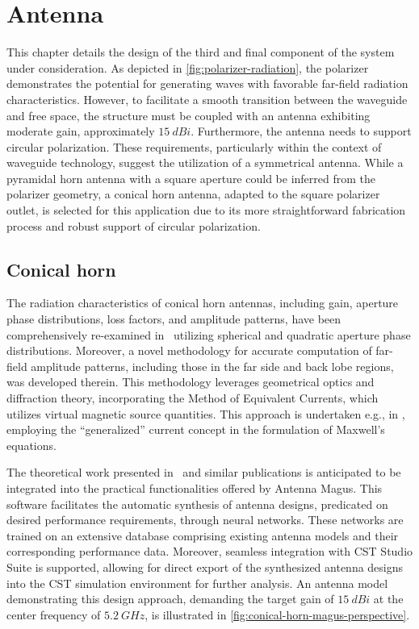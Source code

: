 \documentclass[14pt,a4paper]{ntust_report}
\begin{document}
\chapter{Antenna}
\label{chapter:antenna}
This chapter details the design of the third and final component of the system under consideration. As depicted in \cref{fig:polarizer-radiation}, the polarizer demonstrates the potential for generating waves with favorable far-field radiation characteristics. However, to facilitate a smooth transition between the waveguide and free space, the structure must be coupled with an antenna exhibiting moderate gain, approximately $\qty{15}{dBi}$. Furthermore, the antenna needs to support circular polarization. These requirements, particularly within the context of waveguide technology, suggest the utilization of a symmetrical antenna. While a pyramidal horn antenna with a square aperture could be inferred from the polarizer geometry, a conical horn antenna, adapted to the square polarizer outlet, is selected for this application due to its more straightforward fabrication process and robust support of circular polarization.

\section{Conical horn}
The radiation characteristics of conical horn antennas, including gain, aperture phase distributions, loss factors, and amplitude patterns, have been comprehensively re-examined in~\parencite{aboserwal-et-al:conical-horn-gain-and-amplitude-patterns} utilizing spherical and quadratic aperture phase distributions. Moreover, a novel methodology for accurate computation of far-field amplitude patterns, including those in the far side and back lobe regions, was developed therein. This methodology leverages geometrical optics and diffraction theory, incorporating the Method of Equivalent Currents, which utilizes virtual magnetic source quantities. This approach is undertaken e.g., in \parencite{balanis:advanced-engineering-electromagnetics}, employing the \enquote{generalized} current concept in the formulation of Maxwell's equations.

The theoretical work presented in~\parencite{aboserwal-et-al:conical-horn-gain-and-amplitude-patterns} and similar publications is anticipated to be integrated into the practical functionalities offered by Antenna Magus. This software facilitates the automatic synthesis of antenna designs, predicated on desired performance requirements, through neural networks. These networks are trained on an extensive database comprising existing antenna models and their corresponding performance data. Moreover, seamless integration with CST Studio Suite is supported, allowing for direct export of the synthesized antenna designs into the CST simulation environment for further analysis. An antenna model demonstrating this design approach, demanding the target gain of $\qty{15}{dBi}$ at the center frequency of $\qty{5.2}{GHz}$, is illustrated in \cref{fig:conical-horn-magus-perspective}.
\end{document}
